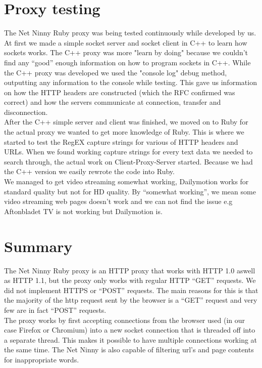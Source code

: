 \documentclass{mall}
\begin{document}
\section{Proxy testing}
The Net Ninny Ruby proxy was being tested continuously while developed by us. At first we made a simple socket server and socket client in C++ to learn how sockets works. The C++ proxy was more "learn by doing" because we couldn't find any ``good'' enough information on how to program sockets in C++. While the C++ proxy was developed we used the "console log" debug method, outputting any information to the console while testing. This gave us information on how the HTTP headers are constructed (which the RFC confirmed was correct) and how the servers communicate at connection, transfer and disconnection.\\
After the C++ simple server and client was finished, we moved on to Ruby for the actual proxy we wanted to get more knowledge of Ruby. This is where we started to test the RegEX capture strings for various of HTTP headers and URLs. When we found working capture strings for every text data we needed to search through, the actual work on Client-Proxy-Server started. Because we had the C++ version we easily rewrote the code into Ruby.\\

We managed to get video streaming somewhat working, Dailymotion works for standard quality but not for HD quality. By ``somewhat working'', we mean some video streaming web pages doesn't work and we can not find the issue e.g Aftonbladet TV is not working but Dailymotion is.
\newpage

\section{Summary}
The Net Ninny Ruby proxy is an HTTP proxy that works with HTTP 1.0 aswell as HTTP 1.1, but the proxy only works with regular HTTP ``GET'' requests. We did not implement HTTPS or ``POST'' requests. The main reasons for this is that the majority of the http request sent by the browser is a ``GET'' request and very few are in fact ``POST'' requests.\\

The proxy works by first accepting connections from the browser used (in our case Firefox or Chromium) into a new socket connection that is threaded off into a separate thread. This makes it possible to have multiple connections working at the same time. The Net Ninny is also capable of filtering url's and page contents for inappropriate words.\\
\end{document}
